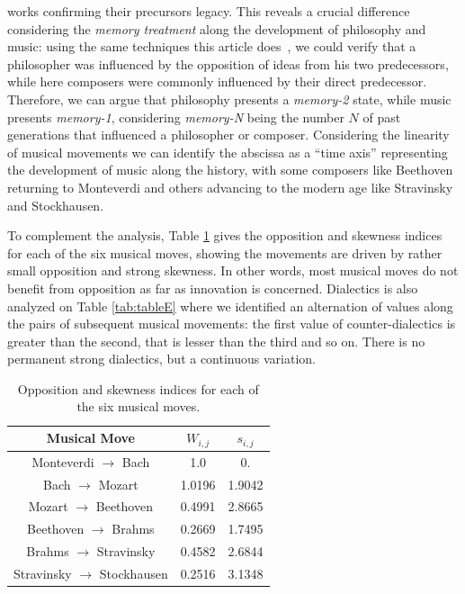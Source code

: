 \documentclass[
 aip,
 jmp,
 amsmath,amssymb,
 reprint,
]{revtex4-1}
\begin{document}
works confirming their precursors legacy. 
This reveals a crucial difference %
considering the \textit{memory treatment} along the development of
philosophy and music: using the same techniques this article does~\cite{Fabbri},
we could verify that a philosopher was influenced by the
opposition of ideas from his two predecessors, while here composers were commonly
influenced by their direct predecessor. Therefore, we can argue that philosophy
presents a \textit{memory-2} state, while music presents
\textit{memory-1}, considering \textit{memory-N} being the number $N$
of past generations that influenced a philosopher or
composer. Considering the linearity of musical movements we can
identify the abscissa as a ``time axis'' representing the development
of music along the history, with some composers
like Beethoven returning to Monteverdi and others advancing to the
modern age like Stravinsky and Stockhausen.

To complement the analysis, Table \ref{tab:tableOI} gives the
opposition and skewness indices for each of the six musical moves,
showing the movements are driven by rather small opposition and strong
skewness. In other words, most musical moves do not benefit from
opposition as far as innovation is concerned. Dialectics is also analyzed on Table
\ref{tab:tableE} where we identified an alternation of values along
the pairs of subsequent musical movements: the first value of
counter-dialectics is greater than the second, that is lesser than the %
third and so on. There is no permanent strong
dialectics, but a continuous variation.

\begin{table}[ht]
\caption{\label{tab:tableOI}Opposition and skewness indices for each
of the six musical moves.}

\begin{tabular}{|c||c|c|}
\hline
Musical Move & $W_{i,j}$ & $s_{i,j}$ \\
\hline \hline

 Monteverdi $\to$ Bach             &   1.0     &  0.      \\
 Bach $\to$ Mozart                 &   1.0196  &  1.9042  \\
 Mozart $\to$ Beethoven            &   0.4991  &  2.8665  \\
 Beethoven $\to$ Brahms            &   0.2669  &  1.7495  \\
 Brahms $\to$ Stravinsky           &   0.4582  &  2.6844  \\
 Stravinsky $\to$ Stockhausen      &   0.2516  &  3.1348  \\

\hline
\end{tabular}
\end{table}
\end{document}
